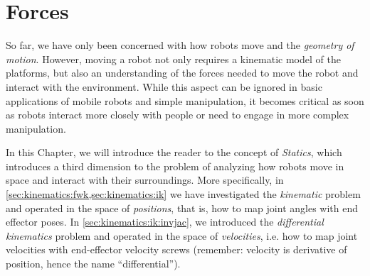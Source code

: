 \chapter{Forces}\label{ch:forces}

So far, we have only been concerned with how robots move and the \textsl{geometry of motion}.
However, moving a robot not only requires a kinematic model of the platforms, but also an understanding of the forces needed to move the robot and interact with the environment.
While this aspect can be ignored in basic applications of mobile robots and simple manipulation, it becomes critical as soon as robots interact more closely with people or need to engage in more complex manipulation.

In this Chapter, we will introduce the reader to the concept of \emph{Statics}, which introduces a third dimension to the problem of analyzing how robots move in space and interact with their surroundings.
More specifically, in \cref{sec:kinematics:fwk,sec:kinematics:ik} we have investigated the \textsl{kinematic} problem and operated in the space of \textsl{positions}, that is, how to map joint angles with end effector poses.
In \cref{sec:kinematics:ik:invjac}, we introduced the \textsl{differential kinematics} problem and operated in the space of \textsl{velocities}, i.e. how to map joint velocities with end-effector velocity screws (remember: velocity is derivative of position, hence the name ``differential'').
